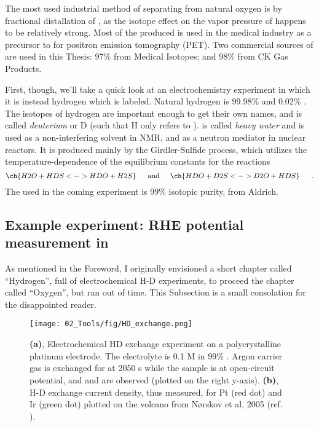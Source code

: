 The most used industrial method of separating  from natural oxygen is by fractional distallation of , as the isotope effect on the vapor pressure of  happens to be relatively strong\cite{Disbudak2018}. Most of the  produced is used in the medical industry as a precursor to  for positron emission tomography (PET).  Two commercial sources of  are used in this Thesis: 97\%  from Medical Isotopes; and 98\%  from CK Gas Products.

First, though, we'll take a quick look at an electrochemistry experiment in which it is instead hydrogen which is labeled. Natural hydrogen is 99.98\%  and 0.02\% . The isotopes of hydrogen are important enough to get their own names, and  is called \textit{deuterium} or D (such that H only refers to ).  is called \textit{heavy water} and is used as a non-interfering solvent in NMR, and as a neutron mediator in nuclear reactors. It is produced mainly by the Girdler-Sulfide process, which utilizes the temperature-dependence of the equilibrium constants for the reactions\cite{Agarwal2016}
\begin{equation}
\ch{H2O + HDS <-> HDO + H2S}\,\hspace{5mm}\text{and}\hspace{5mm}\ch{HDO + D2S <-> D2O + HDS}\hspace{5mm}\,.
\end{equation} 
The  used in the coming experiment is 99\% isotopic purity, from Aldrich.


\subsection{Example experiment: RHE potential measurement in }\label{subsec:isotope_RHE}
As mentioned in the Foreword, I originally envisioned a short chapter called ``Hydrogen'', full of electrochemical H-D experiments, to proceed the chapter called ``Oxygen'', but ran out of time. This Subsection is a small consolation for the disappointed reader.

\begin{figure}[t]
	\centering
	\texttt{[image: 02\_Tools/fig/HD\_exchange.png]}
	\caption{\textbf{(a)}, Electrochemical HD exchange experiment on a polycrystalline platinum electrode. The electrolyte is 0.1 M  in 99\% . Argon carrier gas is exchanged for  at 2050 s while the sample is at open-circuit potential, and  and  are observed (plotted on the right y-axis). \textbf{(b)}, H-D exchange current density, thus measured, for Pt (red dot) and Ir (green dot) plotted on the volcano from N\o rskov et al, 2005 (ref. \cite{Nørskov2005a}).}
	\label{fig:HD}
\end{figure}

